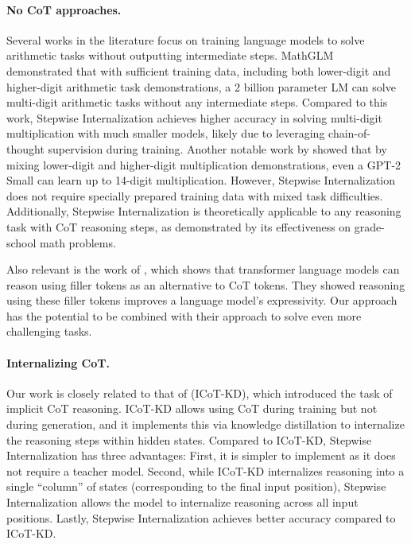 \documentclass{article}
\newcommand{\icotkd}{{ICoT-KD}}
\begin{document}
\paragraph{No CoT approaches.}
Several works in the literature focus on training language models to solve arithmetic tasks without outputting intermediate steps. MathGLM~\citep{yang2023gpt} demonstrated that with sufficient training data, including both lower-digit and higher-digit arithmetic task demonstrations, a 2 billion parameter LM can solve multi-digit arithmetic tasks without any intermediate steps. Compared to this work, Stepwise Internalization achieves higher accuracy in solving multi-digit multiplication with much smaller models, likely due to leveraging chain-of-thought supervision during training. Another notable work by \citet{shen2023positional} showed that by mixing lower-digit and higher-digit multiplication demonstrations, even a GPT-2 Small can learn up to 14-digit multiplication. However, Stepwise Internalization does not require specially prepared training data with mixed task difficulties. Additionally, Stepwise Internalization is theoretically applicable to any reasoning task with CoT reasoning steps, as demonstrated by its effectiveness on grade-school math problems.

Also relevant is the work of \citet{pfau2024lets}, which shows that transformer language models can reason using filler tokens as an alternative to CoT tokens. They showed reasoning using these filler tokens improves a language model's expressivity. Our approach has the potential to be combined with their approach to solve even more challenging tasks. %

\paragraph{Internalizing CoT.}
Our work is closely related to that of \citet{deng2023implicit} (\icotkd), which introduced the task of implicit CoT reasoning. \icotkd{} allows using CoT during training but not during generation, and it implements this via knowledge distillation to internalize the reasoning steps within hidden states. Compared to \icotkd, Stepwise Internalization has three advantages: First, it is simpler to implement as it does not require a teacher model. Second, while \icotkd{} internalizes reasoning into a single ``column'' of states (corresponding to the final input position), Stepwise Internalization allows the model to internalize reasoning across all input positions. Lastly, Stepwise Internalization achieves better accuracy compared to \icotkd.
\end{document}

